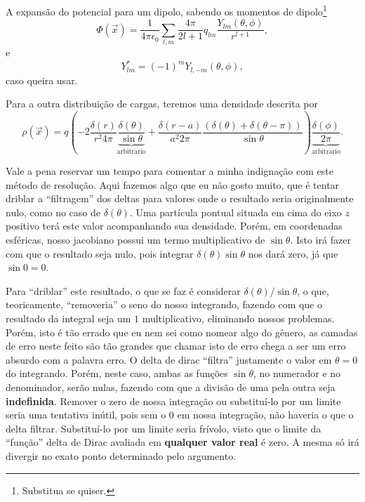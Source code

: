 \documentclass{article}
\begin{document}
A expansão do potencial para um dipolo, sabendo os momentos de dipolo\footnote{Substitua se quiser.}
\begin{equation}
 \Phi(\vec{x}) = \frac{1}{4 \pi \epsilon_0} \sum_{l,m}\frac{4\pi}{2l + 1} q_{lm} \frac{Y_{lm}(\theta,\phi)}{r^{l+1}}\mathrm{,}
\end{equation}
e
\begin{equation}
 Y^{*}_{lm} = (-1)^m Y_{l,-m}(\theta,\phi)\mathrm{,}
\end{equation}
caso queira usar.

Para a outra distribuição de cargas, teremos uma densidade descrita por
\begin{equation}
 \rho(\vec{x}) = q \left(-2\frac{\delta(r)}{r^2 4\pi}\underbrace{\frac{\delta(\theta)}{\sin{\theta}}}_{\mathrm{arbitr\acute{a}rio}} +
 \frac{\delta(r-a)}{a^2 2\pi} \frac{(\delta(\theta) + \delta(\theta - \pi))}{\sin{\theta}}\right)
 \underbrace{\frac{\delta(\phi)}{2\pi}}_{\mathrm{arbitr\acute{a}rio}}\mathrm{.}
\end{equation}

Vale a pena reservar um tempo para comentar a minha indignação com este método de resolução. Aqui fazemos algo que eu não gosto muito, que é tentar driblar a
``filtragem'' dos deltas para valores onde o resultado seria originalmente nulo, como no caso de $\delta(\theta)$. Uma partícula pontual situada em cima do eixo $z$
positivo terá este valor acompanhando sua densidade. Porém, em coordenadas esféricas, nosso jacobiano possui um termo multiplicativo de $\sin{\theta}$. Isto irá fazer
com que o resultado seja nulo, pois integrar $\delta(\theta)\sin{\theta}$ nos dará zero, já que $\sin{0} = 0$.

Para ``driblar'' este resultado, o que se faz é considerar $\delta(\theta)\slash \sin{\theta}$, o que, teoricamente, ``removeria'' o seno do nosso integrando,
fazendo com que o resultado da integral seja um $1$ multiplicativo, eliminando nossos problemas. Porém, isto é tão errado que eu nem sei como nomear algo do gênero,
as camadas de erro neste feito são tão grandes que chamar isto de erro chega a ser um erro absurdo com a palavra erro. O delta de dirac ``filtra'' justamente o valor
em $\theta = 0$ do integrando. Porém, neste caso, ambas as funções $\sin{\theta}$, no numerador e no denominador, serão nulas, fazendo com que a divisão de uma pela
outra seja \textbf{indefinida}. Remover o zero de nossa integração ou substituí-lo por um limite seria uma tentativa inútil, pois sem o $0$ em nossa integração, não
haveria o que o delta filtrar. Substituí-lo por um limite seria frívolo, visto que o limite da ``função'' delta de Dirac avaliada em \textbf{qualquer valor real}
é zero. A mesma só irá divergir no exato ponto determinado pelo argumento.
\end{document}

